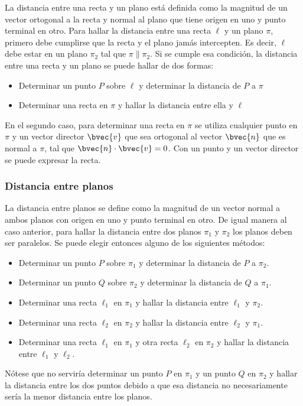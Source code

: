 \documentclass{fmbnotes}
\begin{document}
La distancia entre una recta y un plano está definida como la magnitud de un vector ortogonal a la recta y normal al plano que tiene origen en uno y punto terminal en otro. Para hallar la distancia entre una recta \( \ell \) y un plano \( \pi \), primero debe cumplirse que la recta y el plano jamás intercepten. Es decir, \( \ell \) debe estar en un plano \( \pi_{2} \) tal que \( \pi \parallel \pi_{2}\). Si se cumple esa condición, la distancia entre una recta y un plano se puede hallar de dos formas:
\begin{itemize} \item Determinar un punto \( P \) sobre \( \ell \) y determinar la distancia de \( P \) a \( \pi\)
\item Determinar una recta en \( \pi \) y hallar la distancia entre ella y \( \ell \)
\end{itemize}
En el segundo caso, para determinar una recta en \( \pi \) se utiliza cualquier punto en \( \pi \) y un vector director \( \bvec{v} \) que sea ortogonal al vector \( \bvec{n} \) que es normal a \( \pi \), tal que \( \bvec{n} \cdot \bvec{v}=0 \). Con un punto y un vector director se puede expresar la recta.
\subsubsection{  Distancia entre planos}
La distancia entre planos se define como la magnitud de un vector normal a ambos planos con origen en uno y punto terminal en otro. De igual manera al caso anterior, para hallar la distancia entre dos planos \( \pi_{1} \) y \( \pi_{2} \) los planos deben ser paralelos. Se puede elegir entonces alguno de los siguientes métodos:
\begin{itemize}
\item Determinar un punto \( P \) sobre \( \pi_{1} \) y determinar la distancia de \( P \) a \( \pi_{2} \).
\item Determinar un punto \( Q \) sobre \( \pi_{2} \) y determinar la distancia de \( Q \) a \( \pi_{1} \).
\item Determinar una recta \( \ell_{1} \) en \( \pi_{1} \) y hallar la distancia entre \( \ell_{1} \) y \( \pi_{2} \).
\item Determinar una recta \( \ell_{2} \) en \( \pi_{2} \) y hallar la distancia entre \( \ell_{2} \) y \( \pi_{1} \).
\item Determinar una recta \( \ell_{1} \) en \( \pi_{1} \) y otra recta \( \ell_{2} \) en \( \pi_{2} \) y hallar la distancia entre \( \ell_{1} \) y \( \ell_{2} \).
\end{itemize}
Nótese que no serviría determinar un punto \( P \) en \( \pi_{1} \) y un punto \( Q \) en \( \pi_{2} \) y hallar la distancia entre los dos puntos debido a que esa distancia no necesariamente sería la menor distancia entre los planos.
\end{document}
